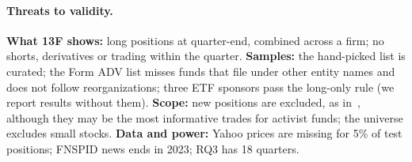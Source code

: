 \paragraph{Threats to validity.}
\textbf{What 13F shows:} long positions at quarter-end, combined
  across a firm; no shorts, derivatives or trading within the quarter.
  \textbf{Samples:} the hand-picked list is curated; the Form ADV list
  misses funds that file under other entity names and does not follow
  reorganizations; three ETF sponsors pass the long-only rule (we report
  results without them).
  \textbf{Scope:} new positions are excluded, as
  in~\cite{cohen2026mimicking}, although they may be the most informative
  trades for activist funds; the universe excludes small stocks.
  \textbf{Data and power:} Yahoo prices are missing for 5\% of test
  positions; FNSPID news ends in 2023; RQ3 has 18 quarters.
